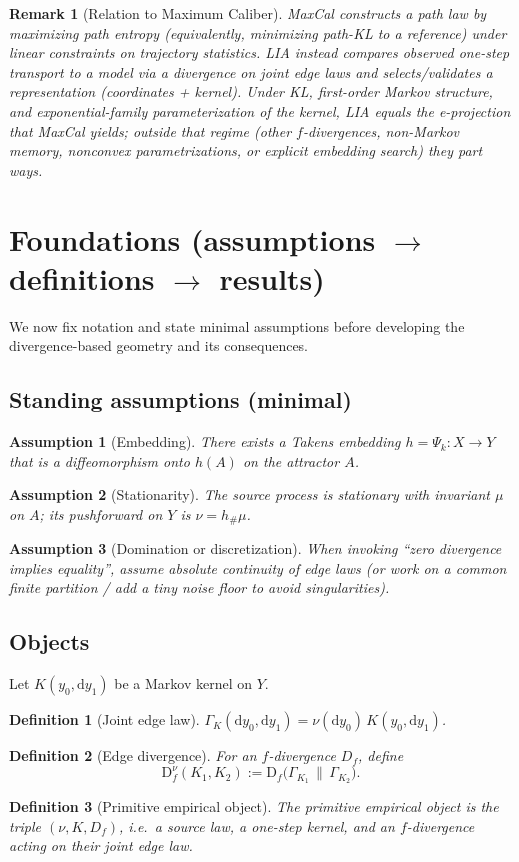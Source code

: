 \documentclass[11pt]{article}
\newtheorem{definition}{Definition}
\newtheorem{assumption}{Assumption}
\newtheorem{remark}{Remark}
\newcommand{\Df}{\mathrm{D}_f}
\newcommand{\1}{\mathbf{1}}
\newcommand{\push}{\#}
\begin{document}
\begin{remark}[Relation to Maximum Caliber]
MaxCal constructs a path law by maximizing path entropy (equivalently, minimizing path-KL to a reference) under linear constraints on trajectory statistics. LIA instead compares observed one-step transport to a model via a divergence on joint edge laws and selects/validates a representation (coordinates + kernel). Under KL, first-order Markov structure, and exponential-family parameterization of the kernel, LIA equals the e-projection that MaxCal yields; outside that regime (other \(f\)-divergences, non-Markov memory, nonconvex parametrizations, or explicit embedding search) they part ways.
\end{remark}

\section{Foundations (assumptions $\to$ definitions $\to$ results)}
We now fix notation and state minimal assumptions before developing the divergence-based geometry and its consequences.

\subsection{Standing assumptions (minimal)}
\begin{assumption}[Embedding]
There exists a Takens embedding \(h=\Psi_k:X\to Y\) that is a diffeomorphism onto \(h(A)\) on the attractor \(A\).
\end{assumption}
\begin{assumption}[Stationarity]
The source process is stationary with invariant \(\mu\) on \(A\); its pushforward on \(Y\) is \(\nu=h_\push\mu\).
\end{assumption}
\begin{assumption}[Domination or discretization]
When invoking ``zero divergence implies equality'', assume absolute continuity of edge laws (or work on a common finite partition / add a tiny noise floor to avoid singularities).
\end{assumption}

\subsection{Objects}
Let \(K(y_0,\mathrm dy_1)\) be a Markov kernel on \(Y\).
\begin{definition}[Joint edge law]
\(\Gamma_K(\mathrm dy_0,\mathrm dy_1)=\nu(\mathrm dy_0)\,K(y_0,\mathrm dy_1)\).
\end{definition}
\begin{definition}[Edge divergence]
For an \(f\)-divergence \(D_f\), define
\[
\Df^{\nu}(K_1,K_2):=\Df\!\big(\Gamma_{K_1}\,\big\|\,\Gamma_{K_2}\big).
\]
\end{definition}
\begin{definition}[Primitive empirical object]
The \emph{primitive empirical object} is the triple \((\nu,K,D_f)\), i.e.\ a source law, a one-step kernel, and an \(f\)-divergence acting on their joint edge law.
\end{definition}
\end{document}
